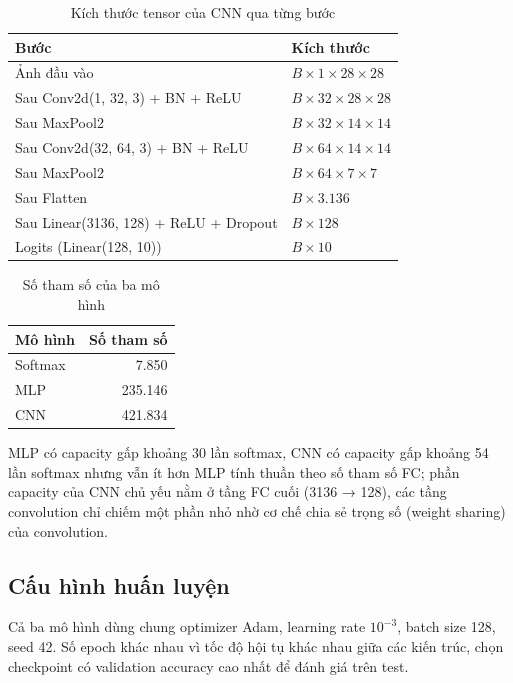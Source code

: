 \documentclass[12pt,a4paper]{article}
\begin{document}
\begin{table}[H]
\centering
\caption{Kích thước tensor của CNN qua từng bước}
\label{tab:cnn-shapes}
\begin{tabular}{ll}
\toprule
Bước & Kích thước \\
\midrule
Ảnh đầu vào & $B \times 1 \times 28 \times 28$ \\
Sau Conv2d(1, 32, 3) + BN + ReLU & $B \times 32 \times 28 \times 28$ \\
Sau MaxPool2 & $B \times 32 \times 14 \times 14$ \\
Sau Conv2d(32, 64, 3) + BN + ReLU & $B \times 64 \times 14 \times 14$ \\
Sau MaxPool2 & $B \times 64 \times 7 \times 7$ \\
Sau Flatten & $B \times 3.136$ \\
Sau Linear(3136, 128) + ReLU + Dropout & $B \times 128$ \\
Logits (Linear(128, 10)) & $B \times 10$ \\
\bottomrule
\end{tabular}
\end{table}

\begin{table}[H]
\centering
\caption{Số tham số của ba mô hình}
\begin{tabular}{lr}
\toprule
Mô hình & Số tham số \\
\midrule
Softmax & 7.850 \\
MLP & 235.146 \\
CNN & 421.834 \\
\bottomrule
\end{tabular}
\end{table}

MLP có capacity gấp khoảng 30 lần softmax, CNN có capacity gấp khoảng 54 lần
softmax nhưng vẫn ít hơn MLP tính thuần theo số tham số FC; phần capacity của
CNN chủ yếu nằm ở tầng FC cuối (3136 → 128), các tầng convolution chỉ chiếm
một phần nhỏ nhờ cơ chế chia sẻ trọng số (weight sharing) của convolution.

\subsection{Cấu hình huấn luyện}

Cả ba mô hình dùng chung optimizer Adam, learning rate $10^{-3}$, batch size
128, seed 42. Số epoch khác nhau vì tốc độ hội tụ khác nhau giữa các kiến
trúc, chọn checkpoint có validation accuracy cao nhất để đánh giá trên test.
\end{document}
